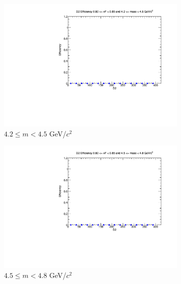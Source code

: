 \begin{figure}[p]
    \centering
    \begin{subfigure}[b]{0.32\textwidth}
        \centering
        \includegraphics[width=\textwidth]{./kTrackerEfficiencyPlots/D2_Efficiency_xF16_mass0.pdf}
        \caption{$4.2 \leq m < 4.5$ GeV/$c^2$}
        \label{fig:xF16_mass0}
    \end{subfigure}
    \hfill
    \begin{subfigure}[b]{0.32\textwidth}
        \centering
        \includegraphics[width=\textwidth]{./kTrackerEfficiencyPlots/D2_Efficiency_xF16_mass1.pdf}
        \caption{$4.5 \leq m < 4.8$ GeV/$c^2$}
        \label{fig:xF16_mass1}
    \end{subfigure}
    \hfill
    \begin{subfigure}[b]{0.32\textwidth}

\end{subfigure}
\end{figure}
